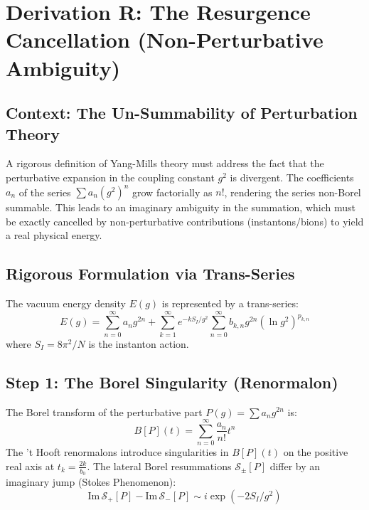 \chapter{Derivation R: The Resurgence Cancellation (Non-Perturbative Ambiguity)}
\label{ch:derivation_r_resurgence}

\section{Context: The Un-Summability of Perturbation Theory}
A rigorous definition of Yang-Mills theory must address the fact that the perturbative expansion in the coupling constant $g^2$ is divergent. The coefficients $a_n$ of the series $\sum a_n (g^2)^n$ grow factorially as $n!$, rendering the series non-Borel summable.
This leads to an imaginary ambiguity in the summation, which must be exactly cancelled by non-perturbative contributions (instantons/bions) to yield a real physical energy.

\section{Rigorous Formulation via Trans-Series}

\begin{definition}
The vacuum energy density $E(g)$ is represented by a trans-series:
\begin{equation}
E(g) = \sum_{n=0}^\infty a_n g^{2n} + \sum_{k=1}^\infty e^{-k S_{I}/g^2} \sum_{n=0}^\infty b_{k,n} g^{2n} (\ln g^2)^{p_{k,n}}
\end{equation}
where $S_{I} = 8\pi^2/N$ is the instanton action.
\end{definition}

\section{Step 1: The Borel Singularity (Renormalon)}
The Borel transform of the perturbative part $P(g) = \sum a_n g^{2n}$ is:
\begin{equation}
B[P](t) = \sum_{n=0}^\infty \frac{a_n}{n!} t^n
\end{equation}
The 't Hooft renormalons introduce singularities in $B[P](t)$ on the positive real axis at $t_k = \frac{2k}{b_0}$.
The lateral Borel resummations $\mathcal{S}_{\pm}[P]$ differ by an imaginary jump (Stokes Phenomenon):
\begin{equation}
\text{Im} \, \mathcal{S}_{+}[P] - \text{Im} \, \mathcal{S}_{-}[P] \sim i \exp(-2S_I/g^2)
\end{equation}

